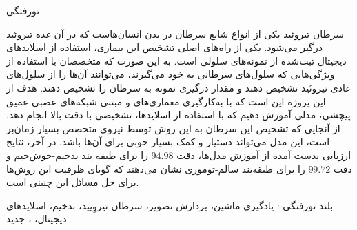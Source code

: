 

\pagestyle{empty}

‌تورفتگی

سرطان تیروئید یکی از انواع شایع سرطان در بدن انسان‌هاست که در آن غده تیروئید درگیر می‌شود.
یکی از راه‌های اصلی تشخیص این بیماری، استفاده از اسلاید‌های دیجیتال ثبت‌شده از نمونه‌‌های سلولی است.
به این صورت که متخصصان با استفاده از ویژگی‌هایی که سلول‌های سرطانی به خود می‌گیرند، می‌توانند آن‌ها را از سلول‌های عادی تیروئید تشخیص دهند و مقدار درگیری نمونه به سرطان را تشخیص دهند.
هدف از این پروژه این است که با به‌کارگیری معماری‌های  و  مبتنی شبکه‌های عصبی عمیق پیچشی، مدلی آموزش دهیم که با استفاده از اسلاید‌ها، تشخیصی با دقت بالا انجام دهد. از آنجایی که تشخیص این سرطان به این روش توسط نیروی متخصص بسیار زمان‌بر است، این مدل می‌تواند دستیار و کمک بسیار خوبی برای آن‌ها باشد.
در آخر، نتایج ارزیابی بدست آمده از آموزش مدل‌ها، دقت $94.98$ را برای طبقه بند بدخیم-خوش‌خیم و دقت $99.72$ را برای طبقه‌بند سالم-توموری نشان می‌دهند که گویای ظرفیت این روش‌ها برای حل مسائل این چنینی است. 

‌بلند
‌تورفتگی :
یادگیری ماشین، پردازش تصویر، سرطان تیروِیید، بدخیم، اسلاید‌های دیجیتال، ، 
‌جدید
